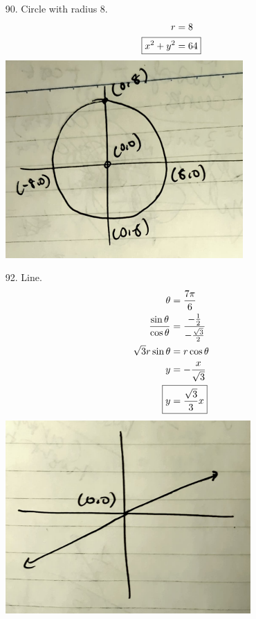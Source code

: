 \documentclass{article}
\begin{document}
\begin{multicols*}{2}
	\begin{itemize}
	\item[90.]
		Circle with radius 8.
		\begin{align*}
			r&=8 \\
			\Aboxed{x^2+y^2&=64}
		\end{align*}
		\includegraphics*[width=\linewidth]{90.png}

	\item[92.]
		Line.
		\begin{align*}
			\theta&=\frac{7\pi}{6} \\
			\frac{\sin\theta}{\cos\theta}&=\frac{-\frac{1}{2}}{-\frac{\sqrt{3}}{2}} \\
			\sqrt{3}r\sin\theta&=r\cos\theta \\
			y&=-\frac{x}{\sqrt{3}} \\
			\Aboxed{y&=\frac{\sqrt{3}}{3}x}
		\end{align*}
		\includegraphics*[width=\linewidth]{92.png}


\end{itemize}
\end{multicols*}
\end{document}
